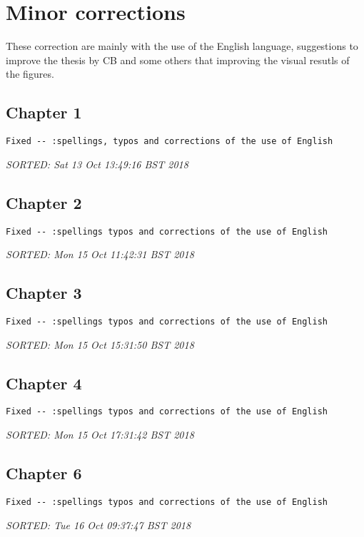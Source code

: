 \documentclass[10pt]{article}
\begin{document}
\section{Minor corrections}
These correction are mainly with the use of the English language, 
suggestions to improve the thesis by CB and some others that improving 
the visual resutls of the figures.


\subsection*{Chapter 1}

\begin{verbatim}
Fixed -- :spellings, typos and corrections of the use of English
\end{verbatim}
\textit{
SORTED: 
Sat 13 Oct 13:49:16 BST 2018
}
\\



\subsection*{Chapter 2}

\begin{verbatim}
Fixed -- :spellings typos and corrections of the use of English
\end{verbatim}
\textit{
SORTED: 
Mon 15 Oct 11:42:31 BST 2018
}
\\


\subsection*{Chapter 3}

\begin{verbatim}
Fixed -- :spellings typos and corrections of the use of English
\end{verbatim}
\textit{
SORTED: 
Mon 15 Oct 15:31:50 BST 2018
}
\\



\subsection*{Chapter 4}

\begin{verbatim}
Fixed -- :spellings typos and corrections of the use of English
\end{verbatim}
\textit{
SORTED: 
Mon 15 Oct 17:31:42 BST 2018
}
\\


\subsection*{Chapter 6}

\begin{verbatim}
Fixed -- :spellings typos and corrections of the use of English
\end{verbatim}
\textit{
SORTED: 
Tue 16 Oct 09:37:47 BST 2018
}
\\
\end{document}
